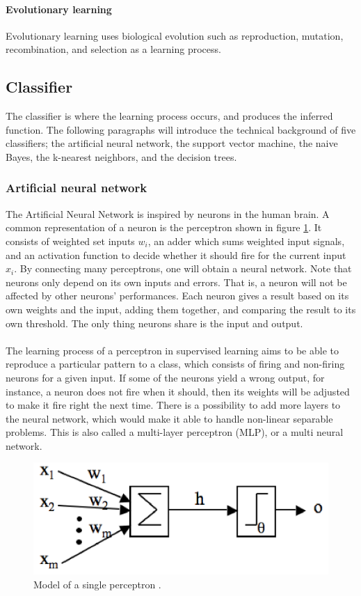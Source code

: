 \documentclass[USenglish]{ifimaster}  %
\begin{document}
\paragraph{Evolutionary learning}
Evolutionary learning uses biological evolution such as reproduction, mutation, recombination, and selection as a learning process.
	
 \subsection{Classifier} \label{sub:classifier}
The classifier is where the learning process occurs, and produces the inferred function. The following paragraphs will introduce the technical background of five classifiers; the artificial neural network, the support vector machine, the naive Bayes, the k-nearest neighbors, and the decision trees.

\subsubsection{Artificial neural network}
The Artificial Neural Network is inspired by neurons in the human brain. A common representation of a neuron is the perceptron shown in figure \ref{fig:NN}. It consists of weighted set inputs $w_i$, an adder which sums weighted input signals, and an activation function to decide whether it should fire for the current input $x_i$. By connecting many perceptrons, one will obtain a neural network. Note that neurons only depend on its own inputs and errors. That is, a neuron will not be affected by other neurons’ performances. Each neuron gives a result based on its own weights and the input, adding them together, and comparing the result to its own threshold. The only thing neurons share is the input and output. 
\\
\\
The learning process of a perceptron in supervised learning aims to be able to reproduce a particular pattern to a class, which consists of firing and non-firing neurons for a given input. If some of the neurons yield a wrong output, for instance, a neuron does not fire when it should, then its weights will be adjusted to make it fire right the next time. There is a possibility to add more layers to the neural network, which would make it able to handle non-linear separable problems. This is also called a multi-layer perceptron (MLP), or a multi neural network.

	
\begin{figure}[h]
	\centering
	\includegraphics[scale=0.9]{Figures/neuron2.PNG}
	\caption[Model of a single perceptron]{Model of a single perceptron \cite{Marsland:2009:MLA:1571643}.}
	\label{fig:NN}
\end{figure}
	
\end{document}
